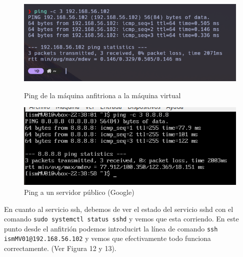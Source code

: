 \begin{figure}[htbp]
    \centering
    \begin{minipage}[b]{0.45\textwidth}
        \centering
        \includegraphics[width=\textwidth]{images/Bloque1/ping_anf_a_mv.png}
        \caption{Ping de la máquina anfitriona a la máquina virtual}
    \end{minipage}
    \hfill
    \begin{minipage}[b]{0.45\textwidth}
        \centering
        \includegraphics[width=\textwidth]{images/Bloque1/ping_fuera.png}
        \caption{Ping a un servidor público (Google)}
    \end{minipage}
\end{figure}


En cuanto al servicio ssh, debemos de ver el estado del servicio sshd con el comando \texttt{sudo systemctl status sshd} y vemos que esta corriendo. En este punto desde el anfitrión podemos introducirt la línea de comando \texttt{ssh ismMV01@192.168.56.102} y vemos que efectivamente todo funciona correctamente. (Ver Figura 12 y 13).






